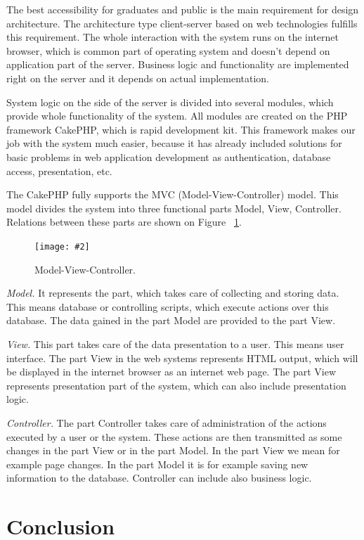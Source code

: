 \documentclass{iitsrc}[2006/14/02]
\newcommand\fig[4]{%
	\begin{figure}[h]
	\begin{center}
	\texttt{[image: \#2]}
	~\\%
	\caption{#4}
	\label{#3}
	\end{center}
	\end{figure}
}
\begin{document}
The best accessibility for graduates and public is the main requirement for design architecture. The architecture type client-server based on web technologies fulfills this requirement. The whole interaction with the system runs on the internet browser, which is common part of operating system and doesn’t depend on application part of the server. Business logic and functionality are implemented right on the server and it depends on actual implementation.

System logic on the side of the server is divided into several modules, which provide whole functionality of the system. All modules are created on the PHP framework CakePHP, which is rapid development kit. This framework makes our job with the system much easier, because it has already included solutions for basic problems in web application development as authentication, database access, presentation, etc.

The CakePHP fully supports the MVC (Model-View-Controller) model\cite{cakephp}. This model divides the system into three functional parts Model, View, Controller. Relations between these parts are shown on Figure ~\ref{fig:mvc}.


\fig{width=7cm}{images/mvc}{fig:mvc}{Model-View-Controller.}

{\em Model.} It represents the part, which takes care of collecting and storing data. This means database or controlling scripts, which execute actions over this database. The data gained in the part Model are provided to the part View.

{\em View.} This part takes care of the data presentation to a user. This means user interface.  The part View in the web systems represents HTML output, which will be displayed in the internet browser as an internet web page. The part View represents presentation part of the system, which can also include presentation logic.

{\em Controller.} The part Controller takes care of administration of the actions executed by a user or the system. These actions are then transmitted as some changes in the part View or in the part Model. In the part View we mean for example page changes. In the part Model it is for example saving new information to the database. Controller can include also business logic.
      
\section{Conclusion}
\end{document}
